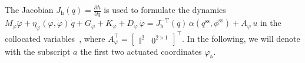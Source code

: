 The Jacobian $J_\mathrm{h}(q) = \frac{\partial h}{\partial q}$ is used to formulate the dynamics $M_\varphi \ddot{\varphi} + \eta_\varphi(\varphi, \dot{\varphi}) \, \dot{q} + G_\varphi + K_\varphi + D_\varphi \, \dot{\varphi} = J_\mathrm{h}^\mathrm{-T}(q) \, \alpha(q^\mathrm{ss},\phi^\mathrm{ss}) + A_\varphi \, u $ in the collocated variables~\citep{khatib1987unified}, where $A_\varphi^\top = \begin{bmatrix}
    \mathbb{I}^{2} & 0^\mathrm{2 \times 1}
\end{bmatrix}^\top$. In the following, we will denote with the subscript $a$ the first two actuated coordinates $\varphi_\mathrm{a}$.
